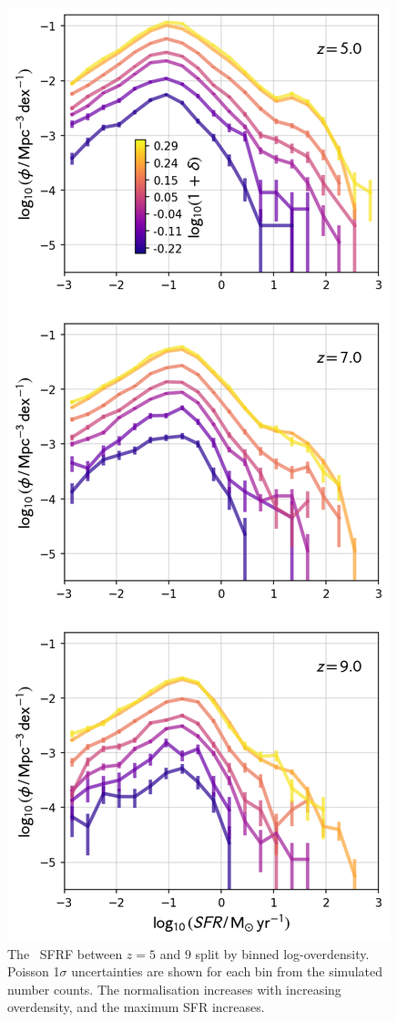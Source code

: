 \begin{figure}
	\includegraphics[width=\columnwidth]{images/sfrf_overdensity.png}
    \caption{The \flares\ SFRF between $z = 5$ and $9$ split by binned log-overdensity.
		Poisson 1$\sigma$ uncertainties are shown for each bin from the simulated number counts.
		The normalisation increases with increasing overdensity, and the maximum SFR increases.}
    \label{fig:sfrf_overdensity}
\end{figure}


